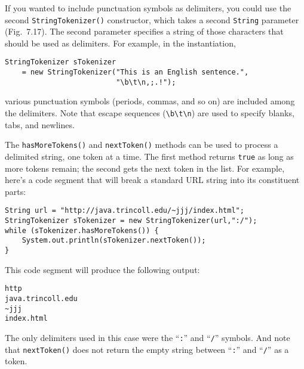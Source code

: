 If you wanted to include punctuation symbols as delimiters, you could
use the second {\tt StringTokenizer()} constructor, which takes a
second {\tt String} parameter (Fig.~7.17).  The second
parameter specifies a string of those characters that should be used
as delimiters.  For example, in the  instantiation,

\begin{jjjlisting}
\begin{lstlisting}
StringTokenizer sTokenizer
    = new StringTokenizer("This is an English sentence.",
                          "\b\t\n,;.!");
\end{lstlisting}
\end{jjjlisting}

\noindent various punctuation symbols (periods, commas, and so on)
are included among the delimiters. Note that escape sequences 
(\verb|\b\t\n|) are used to specify blanks, tabs, and newlines. 

The {\tt hasMoreTokens()} and {\tt nextToken()} methods can be used to
process a delimited string, one token at a time.   The first method
returns {\tt true} as long as more tokens remain; the second gets the
next token in the list.  For example, here's a code segment that will
break a standard URL string into its constituent parts:

\begin{jjjlisting}
\begin{lstlisting}
String url = "http://java.trincoll.edu/~jjj/index.html";
StringTokenizer sTokenizer = new StringTokenizer(url,":/");
while (sTokenizer.hasMoreTokens()) {
    System.out.println(sTokenizer.nextToken());
}
\end{lstlisting}
\end{jjjlisting}

\noindent This code segment will produce the following output:

\begin{jjjlisting}
\begin{lstlisting}
http
java.trincoll.edu
~jjj
index.html
\end{lstlisting}
\end{jjjlisting}

\noindent The only delimiters used in this case were the ``{\tt :}'' and ``{\tt /}''
symbols.  And note that {\tt nextToken()} does not return the empty string
between ``{\tt :}'' and ``{\tt /}'' as a token.


